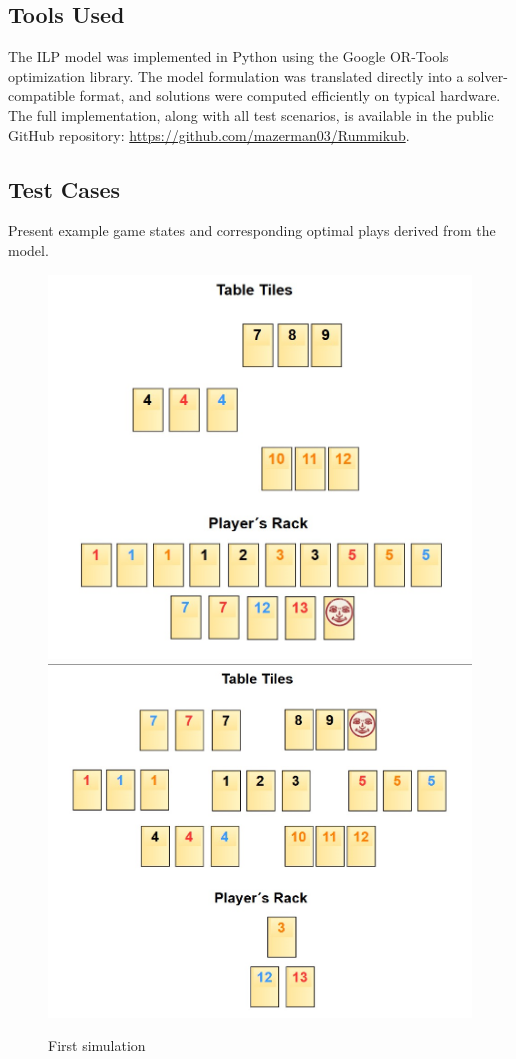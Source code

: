 \documentclass[11pt,letterpaper]{article}
\begin{document}
\subsection*{Tools Used}
The ILP model was implemented in Python using the Google OR-Tools optimization library. The model formulation was translated directly into a solver-compatible format, and solutions were computed efficiently on typical hardware. The full implementation, along with all test scenarios, is available in the public GitHub repository: \url{https://github.com/mazerman03/Rummikub}.

\subsection*{Test Cases}
Present example game states and corresponding optimal plays derived from the model.

\newpage

\begin{figure}[H]
    \centering
    \includegraphics[width=.8\textwidth]{Figures/Initial_Board.png}
    \includegraphics[width=.8\textwidth]{Figures/Final_Board.png}
    \caption{First simulation}
\end{figure}
\end{document}
